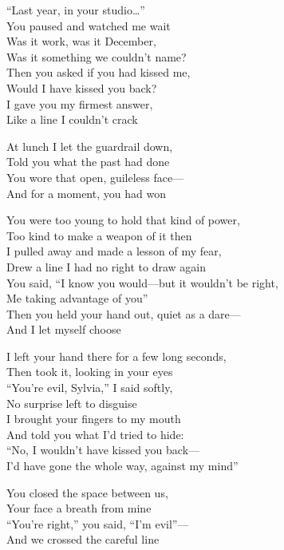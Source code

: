 \begin{lyrics}
“Last year, in your studio…”\\
You paused and watched me wait\\
Was it work, was it December,\\
Was it something we couldn’t name?\\
Then you asked if you had kissed me,\\
Would I have kissed you back?\\
I gave you my firmest answer,\\
Like a line I couldn’t crack

At lunch I let the guardrail down,\\
Told you what the past had done\\
You wore that open, guileless face—\\
And for a moment, you had won

You were too young to hold that kind of power,\\
Too kind to make a weapon of it then\\
I pulled away and made a lesson of my fear,\\
Drew a line I had no right to draw again\\
You said, “I know you would—but it wouldn’t be right,\\
Me taking advantage of you”\\
Then you held your hand out, quiet as a dare—\\
And I let myself choose

I left your hand there for a few long seconds,\\
Then took it, looking in your eyes\\
“You’re evil, Sylvia,” I said softly,\\
No surprise left to disguise\\
I brought your fingers to my mouth\\
And told you what I’d tried to hide:\\
“No, I wouldn’t have kissed you back—\\
I’d have gone the whole way, against my mind”

You closed the space between us,\\
Your face a breath from mine\\
“You’re right,” you said, “I’m evil”—\\
And we crossed the careful line


\end{lyrics}
